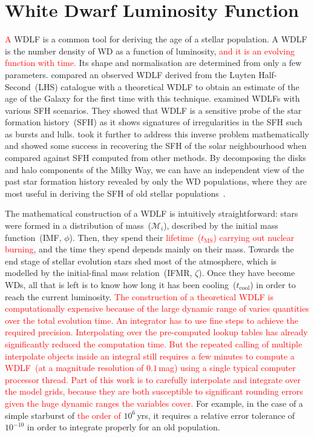 \documentclass[fleqn,usenatbib]{rasti}
\begin{document}
\section{White Dwarf Luminosity Function}
\textcolor{red}{A} WDLF is a common tool for deriving the age of a stellar population. A WDLF is
the number density of WD as a function of luminosity, \textcolor{red}{and it is
an evolving function with time.} Its shape and normalisation are determined
from only a few parameters. \citet{1987ApJ...315L..77W} compared an observed 
WDLF derived from the Luyten Half-Second~(LHS) catalogue with a theoretical
WDLF to obtain an estimate of the age of the Galaxy for the first time with
this technique. \citet{1990ApJ...352..605N} examined WDLFs with various SFH
scenarios. They showed that WDLF is a sensitive probe of the star formation
history~(SFH) as it shows signatures of irregularities in the SFH such as bursts
and lulls. \citet{2013MNRAS.434.1549R} took it further to address this inverse
problem mathematically and showed some success in recovering the SFH of the
solar neighbourhood when compared against SFH computed from other methods. By
decomposing the disks and halo components of the Milky Way, we can have an
independent view of the past star formation history revealed by only the
WD populations, where they are most useful in deriving the SFH of old
stellar populations~\citep{2011MNRAS.417...93R, 2017ASPC..509...25L}.

The mathematical construction of a WDLF is intuitively straightforward: stars
were formed in a distribution of mass~($\mathcal{M}_i$), described by the initial
mass function~(IMF, $\phi$). Then, they spend their \textcolor{red}{lifetime~($t_{\mathrm{MS}}$) carrying out
nuclear burning}, and the time they spend depends mainly on
their mass. Towards the end stage of stellar evolution stars shed most of the
atmosphere, which is modelled by the initial-final mass relation~(IFMR,
$\zeta$). Once they have become WDs, all that is left is to know how long it has
been cooling~($t_{\mathrm{cool}}$) in order to reach the current
luminosity. \textcolor{red}{The construction of a theoretical WDLF is
computationally expensive because of the large dynamic range of varies
quantities over the total evolution time. An integrator has to use fine 
steps to achieve the required precision. Interpolating over the pre-computed
lookup tables has already significantly reduced the computation time. But the
repeated calling of multiple interpolate objects inside an integral still
requires a few minutes to compute a WDLF~(at a magnitude resolution of
$0.1$\,mag) using a single typical computer processor thread. Part of this work
is to carefully interpolate and integrate over the model grids, because they are
both susceptible to significant rounding errors given the huge dynamic ranges
the variables cover.} For example, in the case of a simple starburst of
\textcolor{red}{the order of }$10^6$\,yrs, it requires a relative error
tolerance of $10^{-10}$ in order to integrate properly for an old population.
\end{document}
